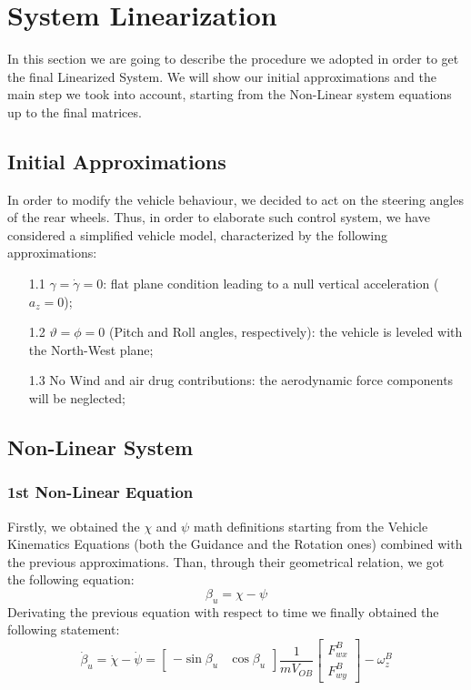 
\chapter{System Linearization}
	In this section we are going to describe the procedure we adopted in order to get the final Linearized System. We will show our initial approximations and the main step we took into account, starting from the Non-Linear system equations up to the final matrices. 
\section{Initial Approximations} \label{approx}
	In order to modify the vehicle behaviour, we decided to act on the steering angles of the rear wheels. Thus, in order to elaborate such control system, we have considered a simplified vehicle model, characterized by the following approximations:
		\begin{itemize}
			\item[1.1] $ \gamma=\dot{\gamma}=0 $: flat plane condition leading to a null vertical acceleration ($ a_{z}=0 $);
			\item[1.2] $\vartheta = \phi = 0$ (Pitch and Roll angles, respectively): the vehicle is leveled with the North-West plane; 
			\item[1.3] No Wind and air drug contributions: the aerodynamic force components will be neglected;
		\end{itemize} 
\section{Non-Linear System}
\subsection{1st Non-Linear Equation} 	
	Firstly, we obtained the $\chi$ and $\psi$ math definitions starting from the Vehicle Kinematics Equations (both the Guidance and the Rotation ones) combined with the previous approximations. Than, through their geometrical relation, we got the following equation:
		\begin{equation}
			\beta_{u} = \chi - \psi
		\end{equation}
	Derivating the previous equation with respect to time we finally obtained the following statement:
		\begin{equation} \label{Betaudot}
			\dot{\beta}_{u} = \dot\chi - \dot\psi = 
			\begin{bmatrix}
			- \sin\beta_{u} & \cos\beta_{u}
			\end{bmatrix}
			\frac{1}{mV_{OB}}
			\begin{bmatrix}
			F_{wx}^{B} \\ F_{wy}^{B}
			\end{bmatrix}
			-\omega_{z}^{B}
		\end{equation}
